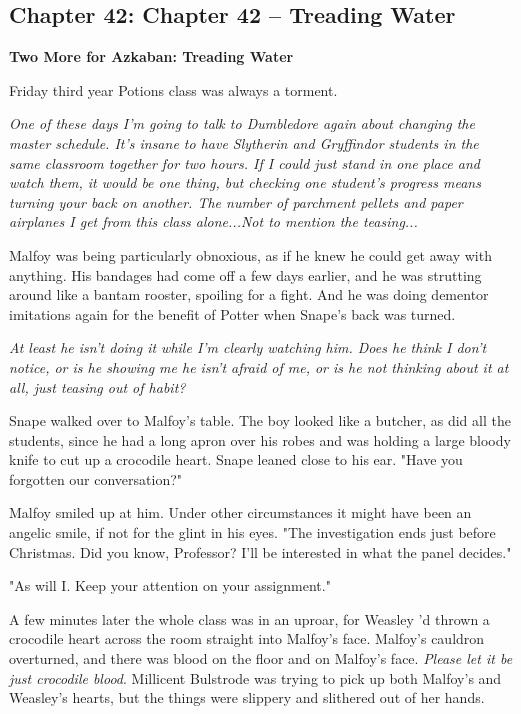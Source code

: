 \documentclass[a4paper,11pt]{article}
\begin{document}
\subsection{Chapter 42: Chapter 42 – Treading Water}

\textbf{Two More for Azkaban: Treading Water}

Friday third year Potions class was always a torment.

\emph{One of these days I'm going to talk to Dumbledore again about changing the master schedule. It's insane to have Slytherin and Gryffindor students in the same classroom together for two hours. If I could just stand in one place and watch them, it would be one thing, but checking one student's progress means turning your back on another. The number of parchment pellets and paper airplanes I get from this class alone...Not to mention the teasing...}

Malfoy was being particularly obnoxious, as if he knew he could get away with anything. His bandages had come off a few days earlier, and he was strutting around like a bantam rooster, spoiling for a fight. And he was doing dementor imitations again for the benefit of Potter when Snape's back was turned.

\emph{At least he isn't doing it while I'm clearly watching him. Does he think I don't notice, or is he showing me he isn't afraid of me, or is he not thinking about it at all, just teasing out of habit?}

Snape walked over to Malfoy's table. The boy looked like a butcher, as did all the students, since he had a long apron over his robes and was holding a large bloody knife to cut up a crocodile heart. Snape leaned close to his ear. "Have you forgotten our conversation?"

Malfoy smiled up at him. Under other circumstances it might have been an angelic smile, if not for the glint in his eyes. "The investigation ends just before Christmas. Did you know, Professor? I'll be interested in what the panel decides."

"As will I. Keep your attention on your assignment."

A few minutes later the whole class was in an uproar, for Weasley 'd thrown a crocodile heart across the room straight into Malfoy's face. Malfoy's cauldron overturned, and there was blood on the floor and on Malfoy's face. \emph{Please let it be just crocodile blood}. Millicent Bulstrode was trying to pick up both Malfoy's and Weasley's hearts, but the things were slippery and slithered out of her hands.
\end{document}
